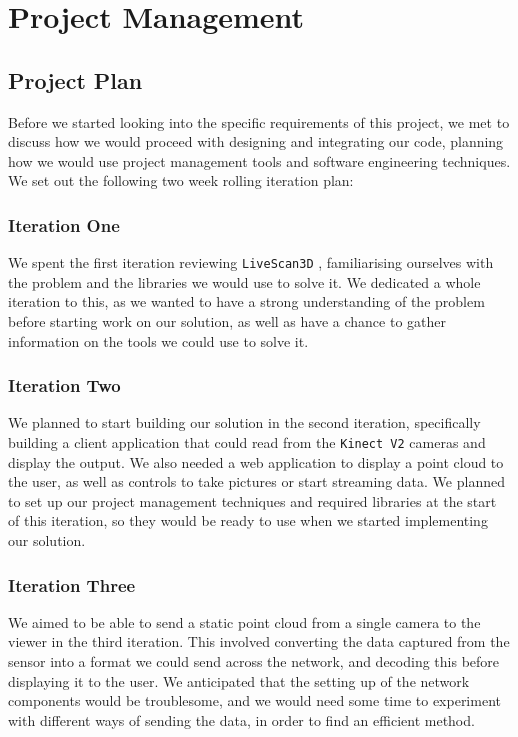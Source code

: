 \documentclass{article}
\begin{document}
\newpage
\section{Project Management}
\subsection{Project Plan}
Before we started looking into the specific requirements of this project, we met to discuss how we would proceed with designing and integrating our code, planning how we would use project management tools and software engineering techniques. We set out the following two week rolling iteration plan:

\subsubsection{Iteration One}
We spent the first iteration reviewing \texttt{LiveScan3D} \cite{livescan}, familiarising ourselves with the problem and the libraries we would use to solve it. We dedicated a whole iteration to this, as we wanted to have a strong understanding of the problem before starting work on our solution, as well as have a chance to gather information on the tools we could use to solve it. 
\subsubsection{Iteration Two}
We planned to start building our solution in the second iteration, specifically building a client application that could read from the \texttt{Kinect V2} cameras and display the output. We also needed a web application to display a point cloud to the user, as well as controls to take pictures or start streaming data. We planned to set up our project management techniques and required libraries at the start of this iteration, so they would be ready to use when we started implementing our solution.
\subsubsection{Iteration Three}
We aimed to be able to send a static point cloud from a single camera to the viewer in the third iteration. This involved converting the data captured from the sensor into a format we could send across the network, and decoding this before displaying it to the user. We anticipated that the setting up of the network components would be troublesome, and we would need some time to experiment with different ways of sending the data, in order to find an efficient method.
\end{document}

